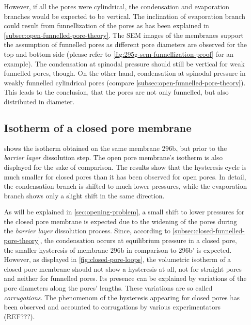 \documentclass[../thesis.tex]{subfiles}
\begin{document}
        However, if all the pores were cylindrical, the condensation and evaporation branches would be expected to be vertical. The inclination of evaporation branch could result from funnellization of the pores as has been explained in \cref{subsec:open-funnelled-pore-theory}. The SEM images of the membranes support the assumption of funnelled pores as different pore diameters are observed for the top and  bottom side (please refer to \cref{fig:295g-sem-funnellization-proof} for an example).  The condensation at spinodal pressure should still be vertical for weak funnelled pores, though. On the other hand, condensation at spinodal pressure in weakly funnelled cylindrical pores (compare \cref{subsec:open-funnelled-pore-theory}). This leads to the conclusion, that the pores are not only funnelled, but also distributed in diameter.



    \subsection{Isotherm of a closed pore membrane}
    \label{subsec:closed-pore-isotherm}

        

         shows the isotherm obtained on the same membrane 296b, but prior to the \textit{barrier layer} dissolution step. The open pore membrane's isotherm is also displayed for the sake of comparison. The results show that the hysteresis cycle is much smaller for closed pores than it has been observed for open pores. In detail, the condensation branch is shifted to much lower pressures, while the evaporation branch shows only a slight shift in the same direction.

        As will be explained in \cref{sec:opening-problem}, a small shift to lower pressures for the closed pore membrane is expected due to the widening of the pores during the \textit{barrier layer} dissolution process. Since, according to \cref{subsec:closed-funnelled-pore-theory}, the condensation occurs at equilibrium pressure in a closed pore, the smaller hysteresis of membrane 296b in comparison to 296b' is expected. However, as displayed in \cref{fig:closed-pore-loops}, the volumetric isotherm of a closed pore membrane should not show a hysteresis at all, not for straight pores and neither for funnelled pores. Its presence can be explained by variations of the pore diameters along the pores' lengths. These variations are so called \textit{corrugations}. The phenomenom of the hysteresis appearing for closed pores has been observed and accounted to corrugations by various experimentators (REF???).
        \medskip
\end{document}

